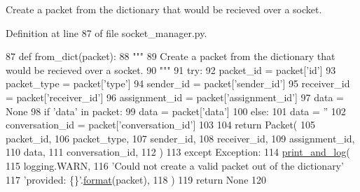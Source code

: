 \begin{DoxyVerb}Create a packet from the dictionary that would be recieved over a socket.
\end{DoxyVerb}
 

Definition at line 87 of file socket\+\_\+manager.\+py.


\begin{DoxyCode}
87     \textcolor{keyword}{def }from\_dict(packet):
88         \textcolor{stringliteral}{"""}
89 \textcolor{stringliteral}{        Create a packet from the dictionary that would be recieved over a socket.}
90 \textcolor{stringliteral}{        """}
91         \textcolor{keywordflow}{try}:
92             packet\_id = packet[\textcolor{stringliteral}{'id'}]
93             packet\_type = packet[\textcolor{stringliteral}{'type'}]
94             sender\_id = packet[\textcolor{stringliteral}{'sender\_id'}]
95             receiver\_id = packet[\textcolor{stringliteral}{'receiver\_id'}]
96             assignment\_id = packet[\textcolor{stringliteral}{'assignment\_id'}]
97             data = \textcolor{keywordtype}{None}
98             \textcolor{keywordflow}{if} \textcolor{stringliteral}{'data'} \textcolor{keywordflow}{in} packet:
99                 data = packet[\textcolor{stringliteral}{'data'}]
100             \textcolor{keywordflow}{else}:
101                 data = \textcolor{stringliteral}{''}
102             conversation\_id = packet[\textcolor{stringliteral}{'conversation\_id'}]
103 
104             \textcolor{keywordflow}{return} Packet(
105                 packet\_id,
106                 packet\_type,
107                 sender\_id,
108                 receiver\_id,
109                 assignment\_id,
110                 data,
111                 conversation\_id,
112             )
113         \textcolor{keywordflow}{except} Exception:
114             \hyperlink{namespaceparlai_1_1mturk_1_1core_1_1dev_1_1test_1_1test__full__system_a5266aae537d9c5f37809ebaf7bcc3b49}{print\_and\_log}(
115                 logging.WARN,
116                 \textcolor{stringliteral}{'Could not create a valid packet out of the dictionary'}
117                 \textcolor{stringliteral}{'provided: \{\}'}.\hyperlink{namespaceparlai_1_1chat__service_1_1services_1_1messenger_1_1shared__utils_a32e2e2022b824fbaf80c747160b52a76}{format}(packet),
118             )
119             \textcolor{keywordflow}{return} \textcolor{keywordtype}{None}
120 
\end{DoxyCode}
\mbox{\label{classparlai_1_1mturk_1_1core_1_1legacy__2018_1_1socket__manager_1_1Packet_ab28122db923d67d773b6c4af0360e6b0}} 
